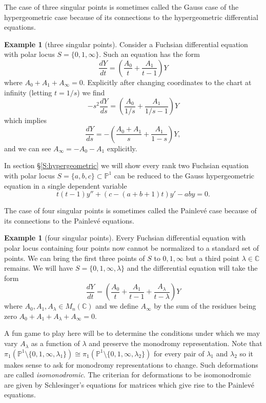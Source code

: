 \documentclass[12pt]{book}
\numberwithin{equation}{section}
\theoremstyle{definition}
\newtheorem{example}[theorem]{Example}
\theoremstyle{remark}
\newcommand{\CC}{\mathbb{C}}
\newcommand{\PP}{\mathbb{P}}
\begin{document}
The case of three singular points is sometimes called the Gauss case of the hypergeometric case because of its connections to the hypergeometric differential equations.
\begin{example}[three singular points]
	Consider a Fuchsian differential equation with polar locus $S= \lbrace 0, 1,\infty\rbrace$. 
	Such an equation has the form
	 $$ \frac{dY}{dt} = \left ( \frac{A_0}{t} + \frac{A_1}{t-1}\right) Y$$
	where $A_0 + A_1 + A_{\infty} =0$.
	Explicitly after changing coordinates to the chart at infinity (letting $t=1/s$) we find
	 $$ -s^2 \dfrac{dY}{ds} = \left ( \frac{A_0}{1/s} + \frac{A_1}{1/s-1}\right) Y $$
	which implies 
	 $$ \dfrac{dY}{ds} =- \left ( \frac{A_0+A_1}{s} + \frac{A_1}{1-s}\right) Y,$$
	and we can see $A_{\infty} = -A_0-A_1$ explicitly. 
	
	In section \S\ref{S:hypergeometric} we will show every rank two Fuchsian equation with polar locus $S=\lbrace a,b,c\rbrace \subset \PP^1$ can be reduced to the Gauss hypergeometric equation in a single dependent variable 
	$$ t(t-1)y'' +(c-(a+b+1)t)y'-aby =0.$$
\end{example}

The case of four singular points is sometimes called the Painlev\'e case because of its connections to the Painlev\'e equations.
\begin{example}[four singular points]
	Every Fuchsian differential equation with polar locus containing four points now cannot be normalized to a standard set of points.
	We can bring the first three points of $S$ to $0,1,\infty$ but a third point $\lambda\in \CC$ remains. 
	We will have $S=\lbrace 0,1,\infty, \lambda\rbrace$ and the differential equation will take the form 
	 $$ \dfrac{dY}{dt} = \left( \frac{A_0}{t} + \frac{A_1}{t-1} + \frac{A_{\lambda}}{t-\lambda}\right) Y $$
	where $A_0,A_1,A_{\lambda}\in M_n(\CC)$ and we define $A_{\infty}$ by the sum of the residues being zero $A_0+A_1+A_{\lambda}+A_{\infty}=0$. 
	
	A fun game to play here will be to determine the conditions under which we may vary $A_{\lambda}$ as a function of $\lambda$ and preserve the monodromy representation. 
	Note that $\pi_1(\PP^1\setminus \lbrace 0,1,\infty,\lambda_1\rbrace) \cong \pi_1(\PP^1\setminus \lbrace 0,1,\infty,\lambda_2\rbrace)$ for every pair of $\lambda_1$ and $\lambda_2$ so it makes sense to ask for monodromy representations to change. 
	Such deformations are called \emph{isomonodromic}.
	The criterian for deformations to be isomonodromic are given by Schlesinger's equations for matrices which give rise to the Painlev\'e equations. 
\end{example}
\end{document}
